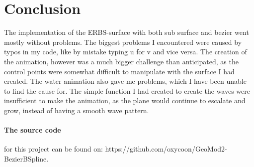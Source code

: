 \documentclass[a4paper,11pt]{article}
\begin{document}
\section{Conclusion}
The implementation of the ERBS-surface with both sub surface and bezier went mostly without problems. The biggest problems I encountered were caused by typos in my code, like by mistake typing u for v and vice versa. The creation of the animation, however was a much bigger challenge than anticipated, 
as the control points were somewhat difficult to manipulate with the surface I had created. The water animation also gave me problems, which I have been unable to find the cause for. The simple function I had created to create the waves were insufficient to make the animation, as the plane would continue
to escalate and grow, instead of having a smooth wave pattern. 

\paragraph{The source code}
for this project can be found on: https://github.com/oxycoon/GeoMod2-BezierBSpline.



\end{document}
